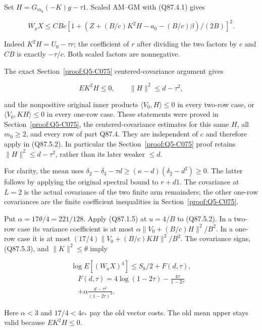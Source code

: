 Set \(H=\allowbreak G_{m_0}(-K)g-\tau1\). Scaled AM–GM with (Q87.4.1) gives

\[
 W_aX\le CBc
 [1+(Z+(B/c)K^2H-a_0-(B/c)\beta)/(2B)]^2.
 \tag{Q87.5.2}\label{eq:Q87:5.2}
\]

Indeed \(K^2H=\allowbreak U_0-\tau r\); the coefficient of \(r\) after
dividing the two factors by \(c\) and \(CB\) is exactly \(-\tau/c\).
Both scaled factors are nonnegative.

The exact Section~\ref{proof:Q5-C075} centered-covariance argument gives

\[
 EK^2H\le0,\qquad \|H\|^2\le d-\tau^2,
 \tag{Q87.5.3}\label{eq:Q87:5.3}
\]

and the nonpositive original inner products
\(\langle V_0,\allowbreak  H\rangle\le\allowbreak 0\) in every two-row case, or
\(\langle V_0,\allowbreak  KH\rangle\le\allowbreak 0\) in every one-row case.
These statements were proved in Section~\ref{proof:Q5-C075}, the centered-covariance estimates for this same
\(H\), all \(m_0\ge\allowbreak 2\), and every row of part Q87.4. They are independent of \(c\) and therefore apply in (Q87.5.2). In particular the Section~\ref{proof:Q5-C075} proof retains
\(\|H\|^2\le\allowbreak  d-\tau^2\), rather than its later weaker \(\le\allowbreak  d\).

For clarity, the mean uses
\(\delta_2-\delta_3-\tau d\ge\allowbreak (\kappa-d)(\delta_2-d^2)\ge\allowbreak 0\).
The latter follows by applying the original spectral bound to
\(r+d1\). The covariance at \(L=\allowbreak 2\) is the actual covariance of
the two finite arm remainders; the other one-row covariances are
the finite coefficient inequalities in Section~\ref{proof:Q5-C075}. 

Put \(\alpha=\allowbreak 17\theta/4=\allowbreak 221/128\). Apply (Q87.1.5) at \(u=\allowbreak 4/B\)
to (Q87.5.2). In a two-row case its variance coefficient is at most
\(\alpha\|V_0+(B/c)H\|^2/B^2\). In a one-row case it is at
most \((17/4)\|V_0+(B/c)KH\|^2/B^2\).
The covariance signs, (Q87.5.3), and \(\|K\|^2\le\allowbreak \theta\) imply

\[
 \log E[(W_aX)^4]\le S_8/2+F(d,\tau),
\]
\[
\begin{gathered}
F(d,\tau)=4\log(1-2\tau)-\frac{4\tau}{1-2\tau}\\
+\alpha\frac{d-\tau^2}{(1-2\tau)^2}.
\end{gathered}\tag{Q87.5.4}\label{eq:Q87:5.4}
\]

Here \(\alpha<\allowbreak 3\) and \(17/4<\allowbreak 4c_*\) pay the old vector costs.
The old mean upper stays valid because \(EK^2H\le\allowbreak 0\).

